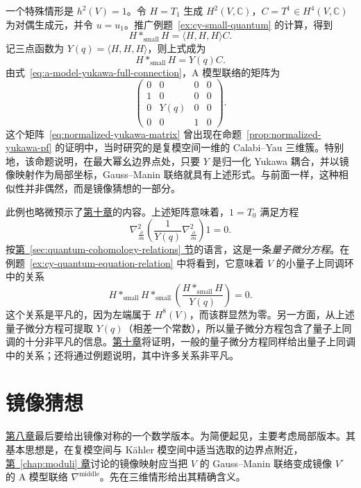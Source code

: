\begin{example}
一个特殊情形是 $h^2(V)=1$。令 $H=T_1$ 生成 $H^2(V,\mathbb C)$，$C=T^1\in H^4(V,\mathbb C)$ 为对偶生成元，并令 $u=u_1$。推广例题~\ref{ex:cy-small-quantum} 的计算，得到
\[
H*_{\mathrm{small}}H=\langle H,H,H\rangle C.
\]
记三点函数为 $Y(q)=\langle H,H,H\rangle$，则上式成为
\begin{equation}\label{eq:one-parameter-quantum-yukawa}
H*_{\mathrm{small}}H=Y(q)C.
\end{equation}
由式~\eqref{eq:a-model-yukawa-full-connection}，A 模型联络的矩阵为
\[
\begin{pmatrix}0&0&0&0\\1&0&0&0\\0&Y(q)&0&0\\0&0&1&0\end{pmatrix}.
\]
这个矩阵~\eqref{eq:normalized-yukawa-matrix} 曾出现在命题~\ref{prop:normalized-yukawa-pf} 的证明中，当时研究的是复模空间一维的 Calabi--Yau 三维簇。特别地，该命题说明，在最大幂幺边界点处，只要 $Y$ 是归一化 Yukawa 耦合，并以镜像映射作为局部坐标，Gauss--Manin 联络就具有上述形式。与前面一样，这种相似性并非偶然，而是镜像猜想的一部分。

此例也略微预示了\hyperref[chap:quantum-differential-equations]{第十章}的内容。上述矩阵意味着，$1=T_0$ 满足方程
\[
\nabla_{\frac{\partial}{\partial u}}^2
\left(\frac1{Y(q)}\nabla_{\frac{\partial}{\partial u}}^2\right)1=0.
\]
按\hyperref[sec:quantum-cohomology-relations]{第~\ref*{sec:quantum-cohomology-relations} 节}的语言，这是一条\emph{量子微分方程}。在例题~\ref{ex:cy-quantum-equation-relation} 中将看到，它意味着 $V$ 的小量子上同调环中的关系
\[
H*_{\mathrm{small}}H*_{\mathrm{small}}\left(\frac{H*_{\mathrm{small}}H}{Y(q)}\right)=0.
\]
这个关系是平凡的，因为左端属于 $H^8(V)$，而该群显然为零。另一方面，从上述量子微分方程可提取 $Y(q)$（相差一个常数），所以量子微分方程包含了量子上同调的十分非平凡的信息。\hyperref[chap:quantum-differential-equations]{第十章}将证明，一般的量子微分方程同样给出量子上同调中的关系；还将通过例题说明，其中许多关系非平凡。
\end{example}

\section{镜像猜想}\label{sec:mirror-symmetry-revisited}
\hyperref[chap:quantum-cohomology]{第八章}最后要给出镜像对称的一个数学版本。为简便起见，主要考虑局部版本。其基本思想是，在复模空间与 Kähler 模空间中适当选取的边界点附近，\hyperref[chap:moduli]{第~\ref*{chap:moduli} 章}讨论的镜像映射应当把 $V$ 的 Gauss--Manin 联络变成镜像 $V^\circ$ 的 A 模型联络 $\nabla^{\mathrm{middle}}$。先在三维情形给出其精确含义。

